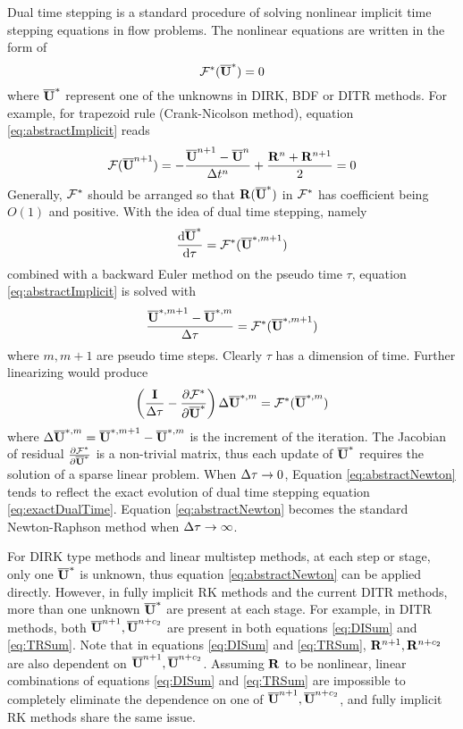 \documentclass[preprint,12pt]{elsarticle}
\begin{document}
Dual time stepping \cite{jameson1991time,jameson2017evaluation}
is a standard procedure of solving nonlinear
implicit time stepping equations
in flow problems.
The nonlinear equations are written in the form of
\begin{equation}
    \mathcal{F}^*(\overline{\mathbf{U}}^*) = 0
    \label{eq:abstractImplicit}
\end{equation}
where $\overline{\mathbf{U}}^*$ represent one of the unknowns
in DIRK, BDF or DITR methods.
For example, for trapezoid rule (Crank-Nicolson method),
equation \eqref{eq:abstractImplicit} reads
\begin{equation}
    \label{eq:trapF}
    \mathcal{F}(\overline{\mathbf{U}}^{n+1}) =
    -\frac{\overline{\mathbf{U}}^{n+1}-\overline{\mathbf{U}}^{n}}{\mathrm\Delta t^n} + \frac{\mathbf{R}^{n} + \mathbf{R}^{n+1}}{2}
    =0
\end{equation}
Generally, $\mathcal{F}^*$ should be arranged so that
$\mathbf{R}(\overline{\mathbf{U}}^*)$ in $\mathcal{F}^*$ has coefficient being $O(1)$ and positive.
With the idea of dual time stepping, namely
\begin{equation}
    \frac{\dd\overline{\mathbf{U}}^{*}}{\dd \tau} = \mathcal{F}^*(\overline{\mathbf{U}}^{*,m+1})
    \label{eq:exactDualTime}
\end{equation}
combined with a backward Euler method on the
pseudo time $\tau$, equation \eqref{eq:abstractImplicit}
is solved with
\begin{equation}
    \frac{\overline{\mathbf{U}}^{*,m+1} - \overline{\mathbf{U}}^{*,m}}{\mathrm\Delta \tau} = \mathcal{F}^*(\overline{\mathbf{U}}^{*,m+1})
\end{equation}
where $m, m+1$ are pseudo time steps.
Clearly $\tau$ has a dimension of time.
Further linearizing would produce
\begin{equation}
    \left(\frac{\eye}{\inc\tau} -
    \partialderivative{\FF^*}{\uu^*}  \right)
    \inc\uu^{*,m} = \FF^*(\uu^{*,m})
    \label{eq:abstractNewton}
\end{equation}
where $\mathrm\Delta\overline{\mathbf{U}}^{*,m} = \overline{\mathbf{U}}^{*,m+1} - \overline{\mathbf{U}}^{*,m}$ is the increment
of the iteration.
The Jacobian of residual $\partialderivative{\FF^*}{\uu^*}$
is a non-trivial matrix, thus each update of $\overline{\mathbf{U}}^*$ requires
the solution of a sparse linear problem.
When $\mathrm\Delta\tau\rightarrow0$, Equation \eqref{eq:abstractNewton}
tends to reflect the exact evolution of dual time stepping
equation \eqref{eq:exactDualTime}.
Equation \eqref{eq:abstractNewton} becomes the
standard Newton-Raphson method when $\mathrm\Delta\tau\rightarrow\infty$.


For DIRK type methods and linear multistep methods, at
each step or stage, only one $\overline{\mathbf{U}}^{*}$ is unknown,
thus equation \eqref{eq:abstractNewton} can be applied directly.
However, in fully implicit RK methods and the current DITR methods,
more than one unknown $\overline{\mathbf{U}}^{*}$ are present at each stage.
For example, in DITR methods, both $\overline{\mathbf{U}}^{n+1},\overline{\mathbf{U}}^{n+c_2}$
are present in both equations \eqref{eq:DISum} and \eqref{eq:TRSum}.
Note that in equations \eqref{eq:DISum} and \eqref{eq:TRSum},
$\mathbf{R}^{n+1},\mathbf{R}^{n+c_2}$ are also dependent on $\overline{\mathbf{U}}^{n+1},\overline{\mathbf{U}}^{n+c_2}$.
Assuming $\mathbf{R}$ to be nonlinear, linear combinations of
equations \eqref{eq:DISum} and \eqref{eq:TRSum} are
impossible to completely eliminate
the dependence on one of $\overline{\mathbf{U}}^{n+1},\overline{\mathbf{U}}^{n+c_2}$, and
fully implicit RK methods share the same issue.
\end{document}
